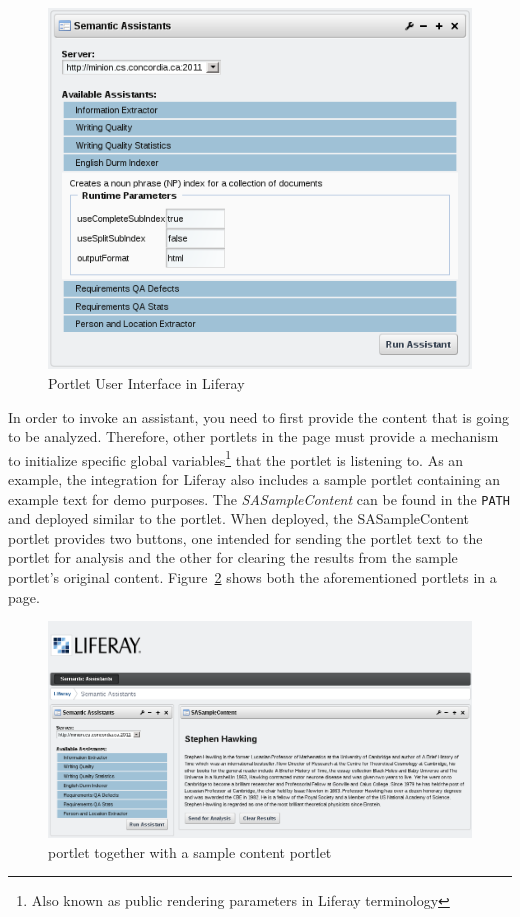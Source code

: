 \begin{figure}
\centering
\includegraphics[scale=0.7]{pictures/liferay_sa_portlet.png}
\caption{\sa Portlet User Interface in Liferay}
\label{fig:liferay_sa_portlet}
\end{figure}

\blankline

In order to invoke an assistant, you need to first provide the content that is going to be analyzed. Therefore, other portlets in the page must provide a mechanism to initialize specific global variables\footnote{Also known as public rendering parameters in Liferay terminology} that the \sa portlet is listening to. As an example, the \sa integration for Liferay also includes a sample portlet containing an example text for demo purposes. The \emph{SASampleContent} can be found in the \texttt{PATH} and deployed similar to the \sa portlet. When deployed, the SASampleContent portlet provides two buttons, one intended for sending the portlet text to the \sa portlet for analysis and the other for clearing the results from the sample portlet's original content. Figure~\ref{fig:liferay_both_portlets} shows both the aforementioned portlets in a page.

\begin{figure}
\centering
\includegraphics[scale=0.6]{pictures/liferay_both_portlets.png}
\caption{\sa portlet together with a sample content portlet}
\label{fig:liferay_both_portlets}
\end{figure}

